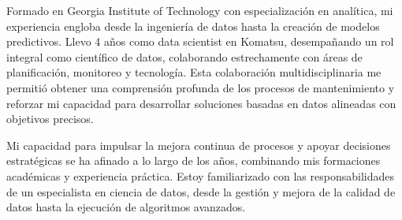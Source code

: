 %
%
%
\par{
    Formado en Georgia Institute of Technology con especialización en analítica, mi experiencia engloba desde la ingeniería de datos hasta la creación de modelos predictivos. Llevo 4 años como data scientist en Komatsu, desempañando un rol integral como científico de datos, colaborando estrechamente con áreas de planificación, monitoreo y tecnología. Esta colaboración multidisciplinaria me permitió obtener una comprensión profunda de los procesos de mantenimiento y reforzar mi capacidad para desarrollar soluciones basadas en datos alineadas con objetivos precisos.
    
    Mi capacidad para impulsar la mejora continua de procesos y apoyar decisiones estratégicas se ha afinado a lo largo de los años, combinando mis formaciones académicas y experiencia práctica. Estoy familiarizado con las responsabilidades de un especialista en ciencia de datos, desde la gestión y mejora de la calidad de datos hasta la ejecución de algoritmos avanzados.


}